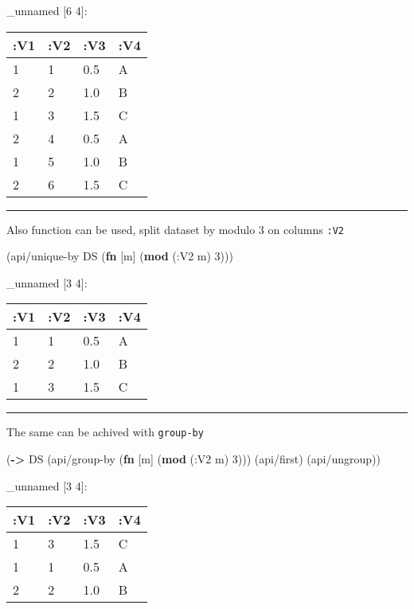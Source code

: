 \documentclass[]{article}
\newenvironment{Shaded}{\begin{snugshade}}{\end{snugshade}}
\newcommand{\AttributeTok}[1]{\textcolor[rgb]{0.77,0.63,0.00}{#1}}
\newcommand{\DecValTok}[1]{\textcolor[rgb]{0.00,0.00,0.81}{#1}}
\newcommand{\KeywordTok}[1]{\textcolor[rgb]{0.13,0.29,0.53}{\textbf{#1}}}
\newcommand{\NormalTok}[1]{#1}
\begin{document}
\_unnamed {[}6 4{]}:

\begin{longtable}[]{@{}llll@{}}
\toprule
:V1 & :V2 & :V3 & :V4\tabularnewline
\midrule
\endhead
1 & 1 & 0.5 & A\tabularnewline
2 & 2 & 1.0 & B\tabularnewline
1 & 3 & 1.5 & C\tabularnewline
2 & 4 & 0.5 & A\tabularnewline
1 & 5 & 1.0 & B\tabularnewline
2 & 6 & 1.5 & C\tabularnewline
\bottomrule
\end{longtable}

\begin{center}\rule{0.5\linewidth}{0.5pt}\end{center}

Also function can be used, split dataset by modulo 3 on columns
\texttt{:V2}

\begin{Shaded}
\begin{Highlighting}[]
\NormalTok{(api/unique-by DS (}\KeywordTok{fn}\NormalTok{ [m] (}\KeywordTok{mod}\NormalTok{ (}\AttributeTok{:V2}\NormalTok{ m) }\DecValTok{3}\NormalTok{)))}
\end{Highlighting}
\end{Shaded}

\_unnamed {[}3 4{]}:

\begin{longtable}[]{@{}llll@{}}
\toprule
:V1 & :V2 & :V3 & :V4\tabularnewline
\midrule
\endhead
1 & 1 & 0.5 & A\tabularnewline
2 & 2 & 1.0 & B\tabularnewline
1 & 3 & 1.5 & C\tabularnewline
\bottomrule
\end{longtable}

\begin{center}\rule{0.5\linewidth}{0.5pt}\end{center}

The same can be achived with \texttt{group-by}

\begin{Shaded}
\begin{Highlighting}[]
\NormalTok{(}\KeywordTok{->}\NormalTok{ DS}
\NormalTok{    (api/group-by (}\KeywordTok{fn}\NormalTok{ [m] (}\KeywordTok{mod}\NormalTok{ (}\AttributeTok{:V2}\NormalTok{ m) }\DecValTok{3}\NormalTok{)))}
\NormalTok{    (api/first)}
\NormalTok{    (api/ungroup))}
\end{Highlighting}
\end{Shaded}

\_unnamed {[}3 4{]}:

\begin{longtable}[]{@{}llll@{}}
\toprule
:V1 & :V2 & :V3 & :V4\tabularnewline
\midrule
\endhead
1 & 3 & 1.5 & C\tabularnewline
1 & 1 & 0.5 & A\tabularnewline
2 & 2 & 1.0 & B\tabularnewline
\bottomrule
\end{longtable}
\end{document}
